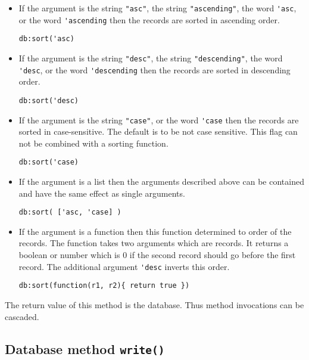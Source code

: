 \documentclass[11pt,a4paper]{scrbook}
\begin{document}
\begin{itemize}
\item If the argument is the string \verb|"asc"|, the string
  \verb|"ascending"|, the word \verb|'asc|, or the word \verb|'ascending| then
  the records are sorted in ascending order.
\begin{lstlisting}[language=BibTool,mathescape=true]
db:sort('asc)
\end{lstlisting}

\item If the argument is the string \verb|"desc"|, the string
  \verb|"descending"|, the word \verb|'desc|, or the word \verb|'descending|
  then the records are sorted in descending order.
\begin{lstlisting}[language=BibTool,mathescape=true]
db:sort('desc)
\end{lstlisting}

\item If the argument is the string \verb|"case"|, or the word \verb|'case|
  then the records are sorted in case-sensitive. The default is to be not case
  sensitive. This flag can not be combined with a sorting function.
\begin{lstlisting}[language=BibTool,mathescape=true]
db:sort('case)
\end{lstlisting}

\item If the argument is a list then the arguments described above can be
  contained and have the same effect as single arguments.
\begin{lstlisting}[language=BibTool,mathescape=true]
db:sort( ['asc, 'case] )
\end{lstlisting}

\item If the argument is a function then this function determined to order of
  the records. The function takes two arguments which are records. It returns
  a boolean or number which is 0 if the second record should go before the
  first record. The additional argument \verb|'desc| inverts this order. 
\begin{lstlisting}[language=BibTool,mathescape=true]
db:sort(function(r1, r2){ return true })
\end{lstlisting}
\end{itemize}

The return value of this method is the database. Thus method invocations can
be cascaded.


\subsection{Database method \texttt{write()}}
\end{document}
